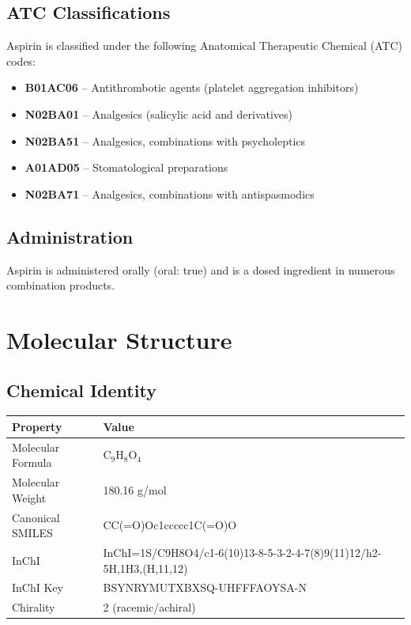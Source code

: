 \documentclass[11pt, a4paper]{article}
\begin{document}
\subsection{ATC Classifications}
Aspirin is classified under the following Anatomical Therapeutic Chemical (ATC) codes:
\begin{itemize}
    \item \textbf{B01AC06} -- Antithrombotic agents (platelet aggregation inhibitors)
    \item \textbf{N02BA01} -- Analgesics (salicylic acid and derivatives)
    \item \textbf{N02BA51} -- Analgesics, combinations with psycholeptics
    \item \textbf{A01AD05} -- Stomatological preparations
    \item \textbf{N02BA71} -- Analgesics, combinations with antispasmodics
\end{itemize}

\subsection{Administration}
Aspirin is administered orally (oral: true) and is a dosed ingredient in numerous combination products.

\section{Molecular Structure}
\subsection{Chemical Identity}
\begin{table}[h!]
\centering
\begin{tabular}{ll}
\toprule
\textbf{Property} & \textbf{Value} \\
\midrule
Molecular Formula & C$_9$H$_8$O$_4$ \\
Molecular Weight & 180.16 g/mol \\
Canonical SMILES & CC(=O)Oc1ccccc1C(=O)O \\
InChI & InChI=1S/C9H8O4/c1-6(10)13-8-5-3-2-4-7(8)9(11)12/h2-5H,1H3,(H,11,12) \\
InChI Key & BSYNRYMUTXBXSQ-UHFFFAOYSA-N \\
Chirality & 2 (racemic/achiral) \\
\bottomrule
\end{tabular}
\end{table}
\end{document}
